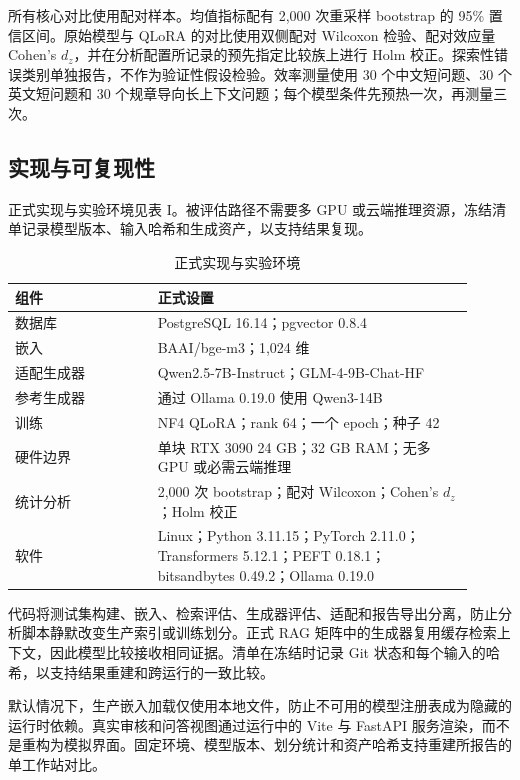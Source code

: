 所有核心对比使用配对样本。均值指标配有 2,000 次重采样 bootstrap 的 95\% 置信区间。原始模型与 QLoRA 的对比使用双侧配对 Wilcoxon 检验、配对效应量 Cohen's $d_z$，并在分析配置所记录的预先指定比较族上进行 Holm 校正。探索性错误类别单独报告，不作为验证性假设检验。效率测量使用 30 个中文短问题、30 个英文短问题和 30 个规章导向长上下文问题；每个模型条件先预热一次，再测量三次。

\subsection{实现与可复现性}

正式实现与实验环境见表 I。被评估路径不需要多 GPU 或云端推理资源，冻结清单记录模型版本、输入哈希和生成资产，以支持结果复现。

\begin{table}[ht]
\centering
\caption{正式实现与实验环境}
\begin{tabular}{p{0.29\linewidth}p{0.62\linewidth}}
\toprule
组件 & 正式设置 \\
\midrule
数据库 & PostgreSQL 16.14；pgvector 0.8.4 \\
嵌入 & BAAI/bge-m3；1,024 维 \\
适配生成器 & Qwen2.5-7B-Instruct；GLM-4-9B-Chat-HF \\
参考生成器 & 通过 Ollama 0.19.0 使用 Qwen3-14B \\
训练 & NF4 QLoRA；rank 64；一个 epoch；种子 42 \\
硬件边界 & 单块 RTX 3090 24 GB；32 GB RAM；无多 GPU 或必需云端推理 \\
统计分析 & 2,000 次 bootstrap；配对 Wilcoxon；Cohen's $d_z$；Holm 校正 \\
软件 & Linux；Python 3.11.15；PyTorch 2.11.0；Transformers 5.12.1；PEFT 0.18.1；bitsandbytes 0.49.2；Ollama 0.19.0 \\
\bottomrule
\end{tabular}
\end{table}

代码将测试集构建、嵌入、检索评估、生成器评估、适配和报告导出分离，防止分析脚本静默改变生产索引或训练划分。正式 RAG 矩阵中的生成器复用缓存检索上下文，因此模型比较接收相同证据。清单在冻结时记录 Git 状态和每个输入的哈希，以支持结果重建和跨运行的一致比较。

默认情况下，生产嵌入加载仅使用本地文件，防止不可用的模型注册表成为隐藏的运行时依赖。真实审核和问答视图通过运行中的 Vite 与 FastAPI 服务渲染，而不是重构为模拟界面。固定环境、模型版本、划分统计和资产哈希支持重建所报告的单工作站对比。

